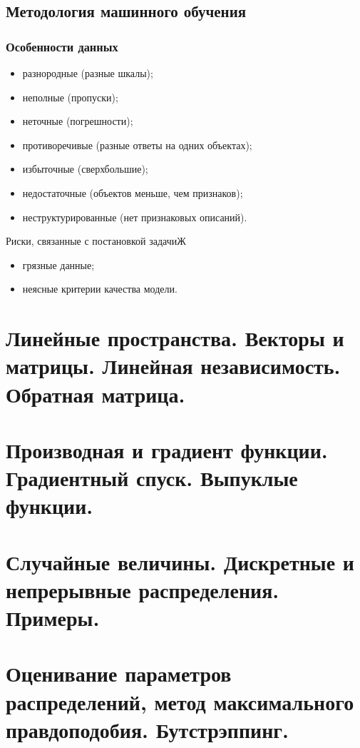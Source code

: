 \begin{multicols}{2}
    \subsection*{Методология машинного обучения}
    \subsubsection*{Особенности данных}
    \begin{itemize}
      \item разнородные (разные шкалы);
      \item неполные (пропуски);
      \item неточные (погрешности);
      \item противоречивые (разные ответы на одних объектах);
      \item избыточные (сверхбольшие);
      \item недостаточные (объектов меньше, чем признаков);
      \item неструктурированные (нет признаковых описаний).
    \end{itemize}
    Риски, связанные с постановкой задачиЖ
    \begin{itemize}
      \item грязные данные;
      \item неясные критерии качества модели.
    \end{itemize}
    \section{Линейные пространства. Векторы и матрицы. Линейная независимость. Обратная
    матрица.}

    \section{Производная и градиент функции. Градиентный спуск. Выпуклые функции.}

    \section{Случайные величины. Дискретные и непрерывные распределения. Примеры.}

    \section{Оценивание параметров распределений, метод максимального правдоподобия.
    Бутстрэппинг.}


\end{multicols}
